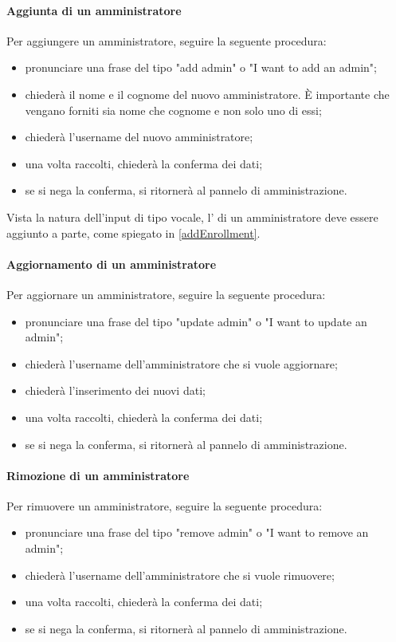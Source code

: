 \paragraph{Aggiunta di un amministratore}\label{AddAdmin}
Per aggiungere un amministratore, seguire la seguente procedura:
\begin{itemize}
	\item pronunciare una frase del tipo "add admin" o "I want to add an admin";
	\item \PROGETTO{} chiederà il nome e il cognome del nuovo amministratore. È importante che vengano forniti sia nome che cognome e non solo uno di essi;
	\item \PROGETTO{} chiederà l'username del nuovo amministratore;
	\item una volta raccolti, \PROGETTO{} chiederà la conferma dei dati;
	\item se si nega la conferma, si ritornerà al pannelo di amministrazione.
\end{itemize}

Vista la natura dell'input di tipo vocale, l' di un amministratore deve essere aggiunto a parte, come spiegato in \ref{addEnrollment}.
\paragraph{Aggiornamento di un amministratore}
 Per aggiornare un amministratore, seguire la seguente procedura:
\begin{itemize}
	\item pronunciare una frase del tipo "update admin" o "I want to update an admin";
	\item \PROGETTO{} chiederà l'username dell'amministratore che si vuole aggiornare;
	\item \PROGETTO{} chiederà l'inserimento dei nuovi dati;
	\item una volta raccolti, \PROGETTO{} chiederà la conferma dei dati;
	\item se si nega la conferma, si ritornerà al pannelo di amministrazione.
\end{itemize}

\paragraph{Rimozione di un amministratore}
 Per rimuovere un amministratore, seguire la seguente procedura:
\begin{itemize}
	\item pronunciare una frase del tipo "remove admin" o "I want to remove an admin";
	\item \PROGETTO{} chiederà l'username dell'amministratore che si vuole rimuovere;
	\item una volta raccolti, \PROGETTO{} chiederà la conferma dei dati;
	\item se si nega la conferma, si ritornerà al pannelo di amministrazione.
\end{itemize}

